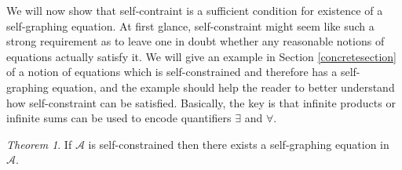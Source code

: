 \documentclass[table, svgnames, dvipsnames, letterpaper, 11pt]{report}
\theoremstyle{remark}
\newtheorem{theorem}{Theorem}
\begin{document}
We will now show that self-contraint is a sufficient condition for existence
of a self-graphing equation. At first glance, self-constraint might seem like
such a strong requirement as to leave one in doubt whether any reasonable
notions of equations actually satisfy it. We will give an example in
Section \ref{concretesection} of a notion of equations which is self-constrained
and therefore has a self-graphing equation, and the example should help the
reader to better understand how self-constraint can be satisfied. Basically,
the key is that infinite products or infinite sums can be used to encode
quantifiers $\exists$ and $\forall$.

\begin{theorem}
\label{maintheorem}
  If $\mathcal A$ is self-constrained then there exists a self-graphing
  equation in $\mathcal A$.
\end{theorem}
\end{document}
